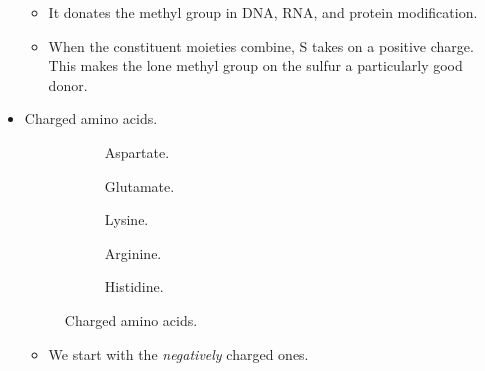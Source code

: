 \documentclass[../notes.tex]{subfiles}
\begin{document}
\begin{itemize}
\begin{figure}[h!]
        \label{fig:SAM}
    \end{figure}
    \begin{itemize}
        \item It donates the methyl group in DNA, RNA, and protein modification.
        \item When the constituent moieties combine, S takes on a positive charge. This makes the lone methyl group on the sulfur a particularly good donor.
    \end{itemize}
    \item Charged amino acids.
    \begin{figure}[h!]
        \centering
        \footnotesize
        \begin{subfigure}[b]{0.19\linewidth}
            \centering
            \caption{Aspartate.}
            \label{fig:AAchargedD}
        \end{subfigure}
        \begin{subfigure}[b]{0.19\linewidth}
            \centering
            \caption{Glutamate.}
            \label{fig:AAchargedE}
        \end{subfigure}
        \begin{subfigure}[b]{0.19\linewidth}
            \centering
            \caption{Lysine.}
            \label{fig:AAchargedK}
        \end{subfigure}
        \begin{subfigure}[b]{0.19\linewidth}
            \centering
            \caption{Arginine.}
            \label{fig:AAchargedR}
        \end{subfigure}
        \begin{subfigure}[b]{0.19\linewidth}
            \centering
            \caption{Histidine.}
            \label{fig:AAchargedH}
        \end{subfigure}
        \caption{Charged amino acids.}
        \label{fig:AAcharged}
    \end{figure}
    \begin{itemize}
        \item We start with the \emph{negatively} charged ones.

\end{itemize}
\end{itemize}
\end{document}
